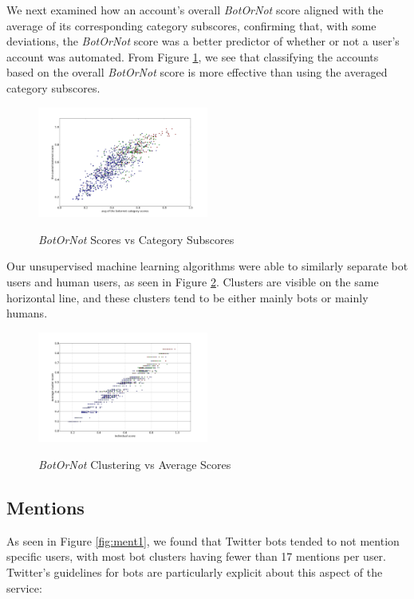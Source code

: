 \documentclass{sig-alternate-05-2015}
\begin{document}
We next examined how an account's overall \emph{BotOrNot} score aligned with the average of its corresponding category subscores, confirming that, with some deviations, the \emph{BotOrNot} score was a better predictor of whether or not a user's account was automated. From Figure \ref{fig:scoresubscore}, we see that classifying the accounts based on the overall \emph{BotOrNot} score is more effective than using the averaged category subscores.

\begin{figure}[h!]
	\caption{\emph{BotOrNot} Scores vs Category Subscores}
	\centering
		\includegraphics[width=0.5\textwidth]{imgs/svacs}
	\label{fig:scoresubscore}
\end{figure}

Our unsupervised machine learning algorithms were able to similarly separate bot users and human users, as seen in Figure \ref{fig:clustscore}. Clusters are visible on the same horizontal line, and these clusters tend to be either mainly bots or mainly humans.

\begin{figure}[h!]
	\caption{\emph{BotOrNot} Clustering vs Average Scores}
	\centering
		\includegraphics[width=0.5\textwidth]{imgs/ourscorevssubscore}
	\label{fig:clustscore}
\end{figure}

\subsection{Mentions}
As seen in Figure \ref{fig:ment1}, we found that Twitter bots tended to not mention specific users, with most bot clusters having fewer than 17 mentions per user. Twitter's guidelines for bots are particularly explicit about this aspect of the service:
\end{document}
